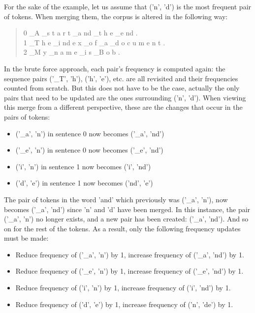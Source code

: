 For the sake of the example, let us assume that ('n', 'd') is the most frequent pair of tokens. When merging them, the corpus is altered in the following way:

\begin{quote}
	0	\_A \_s t a r t \_a nd \_t h e \_e nd .\\
	1 	\_T h e \_i nd e x \_o f \_a \_d o c u m e n t .\\
	2 	\_M y \_n a m e \_i s \_B o b .
\end{quote}

In the brute force approach, each pair's frequency is computed again: the sequence pairs ('\_T', 'h'), ('h', 'e'), etc. are all revisited and their frequencies counted from scratch. But this does not have to be the case, actually the only pairs that need to be updated are the ones surrounding ('n', 'd'). When viewing this merge from a different perspective, these are the changes that occur in the pairs of tokens:

\begin{itemize}
	\item ('\_a', 'n') in sentence 0 now becomes ('\_a', 'nd')
	\item ('\_e', 'n') in sentence 0 now becomes ('\_e', 'nd')
	\item ('i', 'n') in sentence 1 now becomes ('i', 'nd')
	\item ('d', 'e') in sentence 1 now becomes ('nd', 'e')
\end{itemize}

The pair of tokens in the word 'and' which previously was ('\_a', 'n'), now becomes ('\_a', 'nd') since 'n' and 'd' have been merged. In this instance, the pair ('\_a', 'n') no longer exists, and a new pair has been created: ('\_a', 'nd'). And so on for the rest of the tokens. As a result, only the following frequency updates must be made:

\begin{itemize}
	\item Reduce frequency of ('\_a', 'n') by 1, increase frequency of ('\_a', 'nd') by 1.
	\item Reduce frequency of ('\_e', 'n') by 1, increase frequency of ('\_e', 'nd') by 1.
	\item Reduce frequency of ('i', 'n') by 1, increase frequency of ('i', 'nd') by 1.
	\item Reduce frequency of ('d', 'e') by 1, increase frequency of ('n', 'de') by 1.
\end{itemize}

